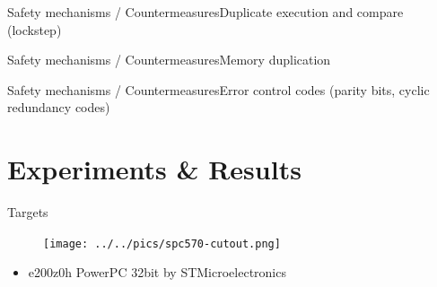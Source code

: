 \documentclass[table]{beamer}
\begin{document}
\begin{frame}{Safety mechanisms / Countermeasures}{Duplicate execution and compare (lockstep)}
    \begin{figure}[H]
      \centering
      \def\svgwidth{\columnwidth}
      
      \label{fig:lockstepdiagram}
    \end{figure}
\end{frame}

\begin{frame}{Safety mechanisms / Countermeasures}{Memory duplication}
    \begin{figure}[H]
      \centering
      \def\svgwidth{\columnwidth}
      
      \label{fig:lockstepdiagram}
    \end{figure}
\end{frame}


\begin{frame}{Safety mechanisms / Countermeasures}{Error control codes (parity bits, cyclic redundancy codes)}
    \begin{figure}[H]
      \centering
      \def\svgwidth{\columnwidth}
      
      \label{fig:lockstepdiagram}
    \end{figure}
\end{frame}


\section{Experiments \& Results}


\begin{frame}
    \tableofcontents[currentsection]
\end{frame}

\begin{frame}[t]{Targets}
    \begin{figure}[H]
      \centering
      \texttt{[image: ../../pics/spc570-cutout.png]}
    \end{figure}

    \begin{itemize}
        \item e200z0h PowerPC 32bit by STMicroelectronics  
    \end{itemize}
\end{frame}
\end{document}
